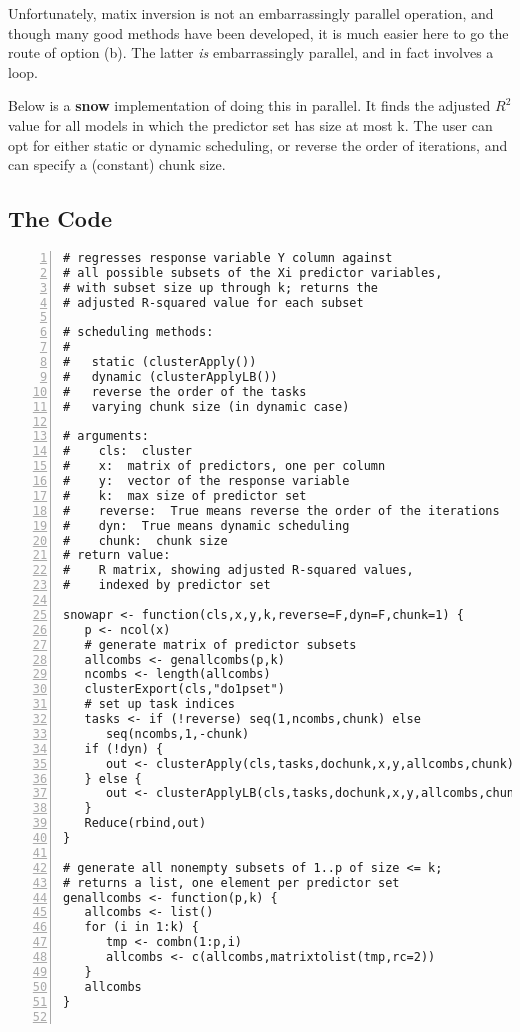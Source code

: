 Unfortunately, matix inversion is not an embarrassingly parallel
operation, and though many good methods have been developed, it is much
easier here to go the route of option (b).  The latter {\it is}
embarrassingly parallel, and in fact involves a loop.

Below is a {\bf snow} implementation of doing this in parallel.  It
finds the adjusted $R^2$ value for all models in which the predictor set
has size at most k.  The user can opt for either static or dynamic
scheduling, or reverse the order of iterations, and can specify a
(constant) chunk size.   

\subsection{The Code}

\begin{lstlisting}[numbers=left]
# regresses response variable Y column against 
# all possible subsets of the Xi predictor variables, 
# with subset size up through k; returns the
# adjusted R-squared value for each subset

# scheduling methods:
#
#   static (clusterApply())
#   dynamic (clusterApplyLB())
#   reverse the order of the tasks
#   varying chunk size (in dynamic case)

# arguments:
#    cls:  cluster
#    x:  matrix of predictors, one per column
#    y:  vector of the response variable
#    k:  max size of predictor set
#    reverse:  True means reverse the order of the iterations
#    dyn:  True means dynamic scheduling
#    chunk:  chunk size 
# return value:
#    R matrix, showing adjusted R-squared values, 
#    indexed by predictor set

snowapr <- function(cls,x,y,k,reverse=F,dyn=F,chunk=1) {
   p <- ncol(x)
   # generate matrix of predictor subsets
   allcombs <- genallcombs(p,k)
   ncombs <- length(allcombs)
   clusterExport(cls,"do1pset")
   # set up task indices 
   tasks <- if (!reverse) seq(1,ncombs,chunk) else 
      seq(ncombs,1,-chunk) 
   if (!dyn) {
      out <- clusterApply(cls,tasks,dochunk,x,y,allcombs,chunk)
   } else {
      out <- clusterApplyLB(cls,tasks,dochunk,x,y,allcombs,chunk)
   }
   Reduce(rbind,out)
}

# generate all nonempty subsets of 1..p of size <= k; 
# returns a list, one element per predictor set
genallcombs <- function(p,k) {
   allcombs <- list()
   for (i in 1:k) {
      tmp <- combn(1:p,i)
      allcombs <- c(allcombs,matrixtolist(tmp,rc=2))
   }
   allcombs
}


\end{lstlisting}
